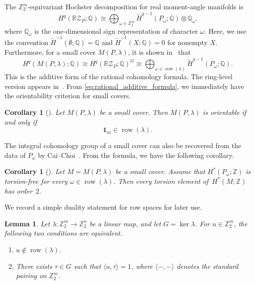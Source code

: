 \documentclass{amsart}
\newtheorem{lemma}[theorem]{Lemma}
\newtheorem{corollary}[theorem]{Corollary}
\numberwithin{equation}{section}
\theoremstyle{definition}
\theoremstyle{remark}
\newcommand{\Z}{\mathbb Z}
\newcommand{\Q}{\mathbb Q}
\newcommand{\RZ}{\mathbb R\mathcal Z}
\newcommand{\one}{\mathbf 1}
\DeclareMathOperator{\row}{row}
\begin{document}
The $\Z_2^m$-equivariant Hochster decomposition for real moment-angle manifolds is
\begin{equation}\label{eq:rational_additive_formula_RZP}
    H^q(\RZ_P;\Q) \cong \bigoplus_{\omega\in \Z_2^m} \widetilde H^{q-1}(P_\omega;\Q) \otimes \Q_\omega.
\end{equation}
where $\Q_\omega$ is the one-dimensional sign representation of character $\omega$.
Here, we use the convention $\widetilde{H}^{-1}(\emptyset;\Q)=\Q$ and $\widetilde{H}^{-1}(X;\Q)=0$ for nonempty $X$.
Furthermore, for a small cover $M(P,\lambda)$, it is shown in~\cite{Choi-Park2017Cohomology} that
\begin{equation}\label{eq:rational_additive_formula}
    H^q(M(P,\lambda);\Q) \cong H^q(\RZ_P;\Q)^G \cong \bigoplus_{\omega\in \row(\lambda)} \widetilde H^{q-1}(P_\omega;\Q).
\end{equation}
This is the additive form of the rational cohomology formula.
The ring-level version appears in~\cite{Choi-Park2020}.
From \eqref{eq:rational_additive_formula}, we immediately have the orientability criterion for small covers.
\begin{corollary}[\cite{Nakayama-Nishimura2005}]\label{cor:NN}
Let $M(P,\lambda)$ be a small cover.
Then $M(P,\lambda)$ is orientable if and only if
$$
    \one_m\in \row(\lambda).
$$
\end{corollary}

The integral cohomology group of a small cover can also be recovered from the data of $P_\omega$ by Cai--Choi~\cite{Cai-Choi2021}.
From the formula, we have the following corollary.
\begin{corollary}[{\cite[Corollary~1.5]{Cai-Choi2021}}] \label{thm:Cai-Choi-two-torsion}
Let $M=M(P,\lambda)$ be a small cover.
Assume that $H^\ast(P_\omega;\Z)$ is torsion-free for every $\omega\in \row(\lambda)$.
Then every torsion element of~$H^\ast(M;\Z)$ has order~$2$.
\end{corollary}

We record a simple duality statement for row spaces for later use.
\begin{lemma}\label{lem:row-kernel-duality}
Let $\lambda\colon \Z_2^m\longrightarrow \Z_2^n$ be a linear map, and let $G=\ker\lambda$.
For $u\in \Z_2^m$, the following two conditions are equivalent.
\begin{enumerate}
\item $u\notin \row(\lambda)$.
\item There exists $\tau\in G$ such that $\langle u,\tau\rangle=1$, where $\langle-,-\rangle$ denotes the standard pairing on $\Z_2^m$.
\end{enumerate}
\end{lemma}
\end{document}
